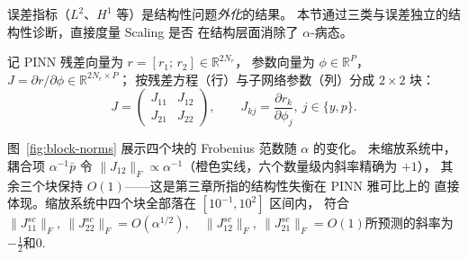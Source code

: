 \documentclass{xmu}
\theoremstyle{plain}
\theoremstyle{remark}
\begin{document}
\begin{table}[H]
\centering
\caption{数值实验设置一览}
\label{tab:exp-config}
\end{table}


\label{subsec:principle}

误差指标（$L^2$、$H^1$ 等）是结构性问题\emph{外化}的结果。
本节通过三类与误差独立的结构性诊断，直接度量 Scaling 是否
在结构层面消除了 $\alpha$-病态。

\label{subsubsec:jacobian}

记 PINN 残差向量为 $r = [r_1;\, r_2] \in \mathbb R^{2N_r}$，
参数向量为 $\phi \in \mathbb R^P$，
$J = \partial r/\partial\phi \in \mathbb R^{2N_r\times P}$；
按残差方程（行）与子网络参数（列）分成 $2\times 2$ 块：
\[
  J = \begin{pmatrix} J_{11} & J_{12}\\ J_{21} & J_{22} \end{pmatrix},
  \qquad
  J_{kj} = \frac{\partial r_k}{\partial\phi_j},\ j\in\{y,p\}.
\]

图~\ref{fig:block-norms} 展示四个块的 Frobenius 范数随 $\alpha$ 的变化。
未缩放系统中，耦合项 $\alpha^{-1}\bar p$ 令
$\|J_{12}\|_F\propto\alpha^{-1}$（橙色实线，六个数量级内斜率精确为 $+1$），
其余三个块保持 $O(1)$——这是第三章所指的结构性失衡在 PINN 雅可比上的
直接体现。缩放系统中四个块全部落在 $[10^{-1}, 10^2]$ 区间内，
符合$
\|J_{11}^{sc}\|_F,\ \|J_{22}^{sc}\|_F = O(\alpha^{1/2}),\quad
\|J_{12}^{sc}\|_F,\ \|J_{21}^{sc}\|_F = O(1)$所预测的斜率为$-\frac{1}{2}$和0.
\end{document}
